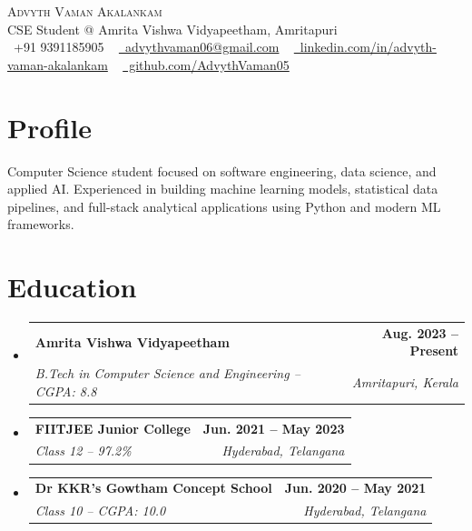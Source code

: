 \documentclass[letterpaper,11pt]{article}
\makeatletter
\newcommand{\resumeSubheading}[4]{
  \vspace{-2pt}\item
    \begin{tabular*}{1.0\textwidth}[t]{l@{\extracolsep{\fill}}r}
      \textbf{#1} & \textbf{\small #2} \\
      \textit{\small#3} & \textit{\small #4} \\
    \end{tabular*}\vspace{-7pt}
}
\newcommand{\resumeSubHeadingListStart}{\begin{itemize}[leftmargin=0.0in, label={}]}
\newcommand{\resumeSubHeadingListEnd}{\end{itemize}}
\makeatother
\begin{document}

\begin{center}
    {\Huge \scshape Advyth Vaman Akalankam} \\ \vspace{1pt}
    CSE Student @ Amrita Vishwa Vidyapeetham, Amritapuri \\ \vspace{1pt}
    \small
    \raisebox{-0.1\height}\faPhone\ +91 9391185905 ~
    \href{mailto:advythvaman06@gmail.com}
    {\raisebox{-0.2\height}\faEnvelope\ advythvaman06@gmail.com} ~
    \href{https://linkedin.com/in/advyth-vaman-akalankam}
    {\raisebox{-0.2\height}\faLinkedin\ linkedin.com/in/advyth-vaman-akalankam} ~
    \href{https://github.com/AdvythVaman05}
    {\raisebox{-0.2\height}\faGithub\ github.com/AdvythVaman05}
    \vspace{-8pt}
\end{center}


\section{Profile}
\small{
Computer Science student focused on software engineering, data science, and applied AI. Experienced in building machine learning models, statistical data pipelines, and full-stack analytical applications using Python and modern ML frameworks.
}
\vspace{-5pt}


\section{Education}
  \resumeSubHeadingListStart

    \resumeSubheading
      {Amrita Vishwa Vidyapeetham}{Aug. 2023 -- Present}
      {B.Tech in Computer Science and Engineering \textnormal{-- CGPA: 8.8}}{Amritapuri, Kerala}

    \resumeSubheading
      {FIITJEE Junior College}{Jun. 2021 -- May 2023}
      {Class 12 \textnormal{-- 97.2\%}}{Hyderabad, Telangana}

    \resumeSubheading
      {Dr KKR's Gowtham Concept School}{Jun. 2020 -- May 2021}
      {Class 10 \textnormal{-- CGPA: 10.0}}{Hyderabad, Telangana}

  \resumeSubHeadingListEnd
\vspace{-8pt}


\end{document}
